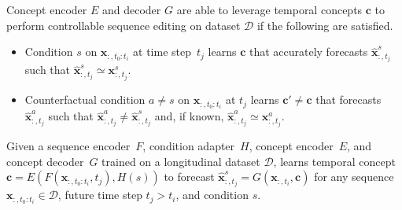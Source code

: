\begin{definition}
\label{def:concept_cse}
Concept encoder $E$ and decoder $G$ are able to leverage temporal concepts $\mathbf{c}$ to perform controllable sequence editing on dataset $\mathcal{D}$ if the following are satisfied.
\begin{itemize}[leftmargin=*,noitemsep,topsep=0pt]
    \item
    Condition $s$ on $\mathbf{x}_{:,t_0:t_i}$ at time step~$t_j$ learns $\mathbf{c}$ that accurately forecasts $\hat{\mathbf{x}}^s_{:,t_j}$ such that $\hat{\mathbf{x}}^s_{:,t_j} \simeq \mathbf{x}^s_{:,t_j}$.
    \item 
    Counterfactual condition $a \neq s$ on $\mathbf{x}_{:,t_0:t_i}$ at $t_j$ learns $\mathbf{c}' \neq \mathbf{c}$ that forecasts $\hat{\mathbf{x}}^a_{:,t_j}$ such that $\hat{\mathbf{x}}^a_{:,t_j} \neq \hat{\mathbf{x}}^s_{:,t_j}$ and, if known, $\hat{\mathbf{x}}^a_{:,t_j} \simeq \mathbf{x}^a_{:,t_j}$.
    \end{itemize}
\end{definition}



\begin{problemst}[\name]
\label{prob}
Given a sequence encoder~$F$, condition adapter~$H$, concept encoder~$E$, and concept decoder~$G$ trained on a longitudinal dataset $\mathcal{D}$, \name learns temporal concept $\mathbf{c} = E(F(\mathbf{x}_{:,t_0:t_i}, t_j), H(s))$ to forecast $\hat{\mathbf{x}}^s_{:,t_j} = G(\mathbf{x}_{:,t_i}, \mathbf{c})$ for any sequence $\mathbf{x}_{:,t_0:t_i} \in \mathcal{D}$, future time step $t_j > t_i$, and condition $s$.
\end{problemst}

